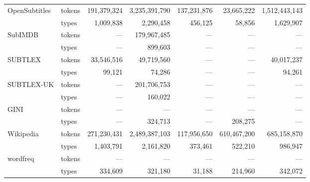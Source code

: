 \begin{tabular}{llrrrrr}
\multirow[c]{2}{*}{OpenSubtitles} & tokens & 191,379,324 & 3,235,391,790 & 137,231,876 & 23,665,222 & 1,512,443,143 \\
 & \cellcolor[HTML]{EEEEEE} types & \cellcolor[HTML]{EEEEEE} 1,009,838 & \cellcolor[HTML]{EEEEEE} 2,290,458 & \cellcolor[HTML]{EEEEEE} 456,125 & \cellcolor[HTML]{EEEEEE} 58,856 & \cellcolor[HTML]{EEEEEE} 1,629,907 \\
\multirow[c]{2}{*}{SubIMDB} & tokens & {---} & 179,967,485 & {---} & {---} & {---} \\
 & \cellcolor[HTML]{EEEEEE} types & \cellcolor[HTML]{EEEEEE} {---} & \cellcolor[HTML]{EEEEEE} 899,603 & \cellcolor[HTML]{EEEEEE} {---} & \cellcolor[HTML]{EEEEEE} {---} & \cellcolor[HTML]{EEEEEE} {---} \\
\multirow[c]{2}{*}{SUBTLEX} & tokens & 33,546,516 & 49,719,560 & {---} & {---} & 40,017,237 \\
 & \cellcolor[HTML]{EEEEEE} types & \cellcolor[HTML]{EEEEEE} 99,121 & \cellcolor[HTML]{EEEEEE} 74,286 & \cellcolor[HTML]{EEEEEE} {---} & \cellcolor[HTML]{EEEEEE} {---} & \cellcolor[HTML]{EEEEEE} 94,261 \\
\multirow[c]{2}{*}{SUBTLEX-UK} & tokens & {---} & 201,706,753 & {---} & {---} & {---} \\
 & \cellcolor[HTML]{EEEEEE} types & \cellcolor[HTML]{EEEEEE} {---} & \cellcolor[HTML]{EEEEEE} 160,022 & \cellcolor[HTML]{EEEEEE} {---} & \cellcolor[HTML]{EEEEEE} {---} & \cellcolor[HTML]{EEEEEE} {---} \\
\multirow[c]{2}{*}{GINI} & tokens & {---} & {---} & {---} & {---} & {---} \\
 & \cellcolor[HTML]{EEEEEE} types & \cellcolor[HTML]{EEEEEE} {---} & \cellcolor[HTML]{EEEEEE} 324,713 & \cellcolor[HTML]{EEEEEE} {---} & \cellcolor[HTML]{EEEEEE} 208,275 & \cellcolor[HTML]{EEEEEE} {---} \\
\multirow[c]{2}{*}{Wikipedia} & tokens & 271,230,431 & 2,489,387,103 & 117,956,650 & 610,467,200 & 685,158,870 \\
 & \cellcolor[HTML]{EEEEEE} types & \cellcolor[HTML]{EEEEEE} 1,403,791 & \cellcolor[HTML]{EEEEEE} 2,161,820 & \cellcolor[HTML]{EEEEEE} 373,461 & \cellcolor[HTML]{EEEEEE} 522,210 & \cellcolor[HTML]{EEEEEE} 986,947 \\
\multirow[c]{2}{*}{wordfreq} & tokens & {---} & {---} & {---} & {---} & {---} \\
 & \cellcolor[HTML]{EEEEEE} types & \cellcolor[HTML]{EEEEEE} 334,609 & \cellcolor[HTML]{EEEEEE} 321,180 & \cellcolor[HTML]{EEEEEE} 31,188 & \cellcolor[HTML]{EEEEEE} 214,960 & \cellcolor[HTML]{EEEEEE} 342,072 \\

\end{tabular}
